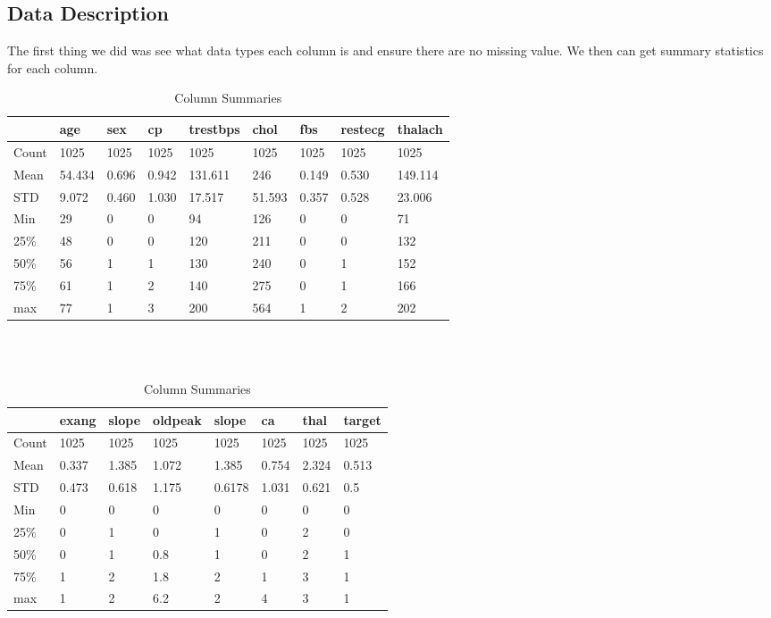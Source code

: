 \documentclass[letter]{article}
\begin{document}
\subsection{Data Description}
The first thing we did was see what data types each column is and ensure there are no missing value.  We then can get summary statistics for each column.
\begin{table}[]
	\begin{tabular}{@{}lllllllll@{}}
		\toprule
		& age    & sex   & cp    & trestbps & chol   & fbs   & restecg & thalach \\ \midrule
		Count & 1025   & 1025  & 1025  & 1025     & 1025   & 1025  & 1025    & 1025    \\
		Mean  & 54.434 & 0.696 & 0.942 & 131.611  & 246    & 0.149 & 0.530   & 149.114 \\
		STD   & 9.072  & 0.460 & 1.030 & 17.517   & 51.593 & 0.357 & 0.528   & 23.006  \\
		Min   & 29     & 0     & 0     & 94       & 126    & 0     & 0       & 71      \\
		25\%  & 48     & 0     & 0     & 120      & 211    & 0     & 0       & 132     \\
		50\%  & 56     & 1     & 1     & 130      & 240    & 0     & 1       & 152     \\
		75\%  & 61     & 1     & 2     & 140      & 275    & 0     & 1       & 166     \\
		max   & 77     & 1     & 3     & 200      & 564    & 1     & 2       & 202     \\ \bottomrule
	\end{tabular}\\
\\
\begin{tabular}{@{}llllllll@{}}
	\toprule
	& exang & slope & oldpeak & slope  & ca    & thal  & target \\ \midrule
	Count & 1025  & 1025  & 1025    & 1025   & 1025  & 1025  & 1025   \\
	Mean  & 0.337 & 1.385 & 1.072   & 1.385  & 0.754 & 2.324 & 0.513  \\
	STD   & 0.473 & 0.618 & 1.175   & 0.6178 & 1.031 & 0.621 & 0.5    \\
	Min   & 0     & 0     & 0       & 0      & 0     & 0     & 0      \\
	25\%  & 0     & 1     & 0       & 1      & 0     & 2     & 0      \\
	50\%  & 0     & 1     & 0.8     & 1      & 0     & 2     & 1      \\
	75\%  & 1     & 2     & 1.8     & 2      & 1     & 3     & 1      \\
	max   & 1     & 2     & 6.2     & 2      & 4     & 3     & 1      \\ \bottomrule
\end{tabular}
\caption{Column Summaries}
\label{tab:col_summary}
\end{table}
\end{document}
